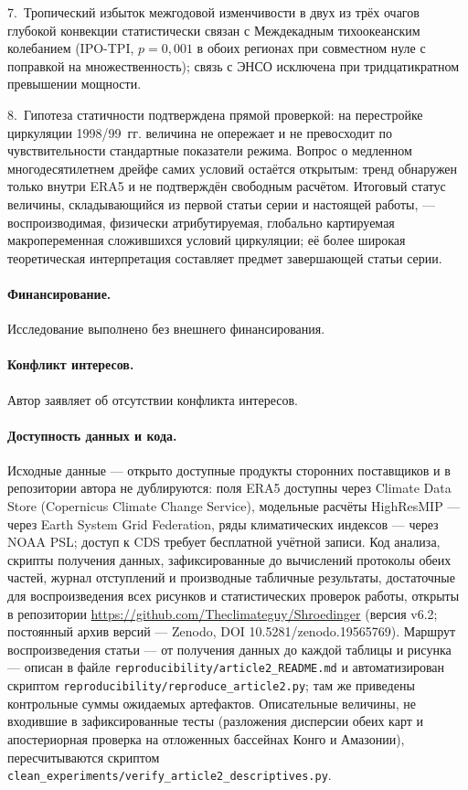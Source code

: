 \documentclass[11pt,a4paper]{article}
\begin{document}
7.~Тропический избыток межгодовой изменчивости в двух из трёх очагов глубокой конвекции статистически связан с Междекадным тихоокеанским колебанием (IPO-TPI, $p=0{,}001$ в обоих регионах при совместном нуле с поправкой на множественность); связь с ЭНСО исключена при тридцатикратном превышении мощности.

8.~Гипотеза статичности подтверждена прямой проверкой: на перестройке циркуляции 1998/99~гг. величина не опережает и не превосходит по чувствительности стандартные показатели режима. Вопрос о медленном многодесятилетнем дрейфе самих условий остаётся открытым: тренд обнаружен только внутри ERA5 и не подтверждён свободным расчётом. Итоговый статус величины, складывающийся из первой статьи серии и настоящей работы, --- воспроизводимая, физически атрибутируемая, глобально картируемая макропеременная сложившихся условий циркуляции; её более широкая теоретическая интерпретация составляет предмет завершающей статьи серии.

\paragraph{Финансирование.} Исследование выполнено без внешнего финансирования.

\paragraph{Конфликт интересов.} Автор заявляет об отсутствии конфликта интересов.

\paragraph{Доступность данных и кода.} Исходные данные --- открыто доступные продукты сторонних поставщиков и в репозитории автора не дублируются: поля ERA5 доступны через Climate Data Store (Copernicus Climate Change Service), модельные расчёты HighResMIP --- через Earth System Grid Federation, ряды климатических индексов --- через NOAA PSL; доступ к CDS требует бесплатной учётной записи. Код анализа, скрипты получения данных, зафиксированные до вычислений протоколы обеих частей, журнал отступлений и производные табличные результаты, достаточные для воспроизведения всех рисунков и статистических проверок работы, открыты в репозитории \url{https://github.com/Theclimateguy/Shroedinger} (версия v6.2; постоянный архив версий --- Zenodo, DOI 10.5281/zenodo.19565769). Маршрут воспроизведения статьи --- от получения данных до каждой таблицы и рисунка --- описан в файле \texttt{reproducibility/article2\_README.md} и автоматизирован скриптом \texttt{reproducibility/reproduce\_article2.py}; там же приведены контрольные суммы ожидаемых артефактов. Описательные величины, не входившие в зафиксированные тесты (разложения дисперсии обеих карт и апостериорная проверка на отложенных бассейнах Конго и Амазонии), пересчитываются скриптом \texttt{clean\_experiments/}\allowbreak\texttt{verify\_article2\_}\allowbreak\texttt{descriptives.py}.

\printbibliography[title={Список литературы}]
\end{document}
